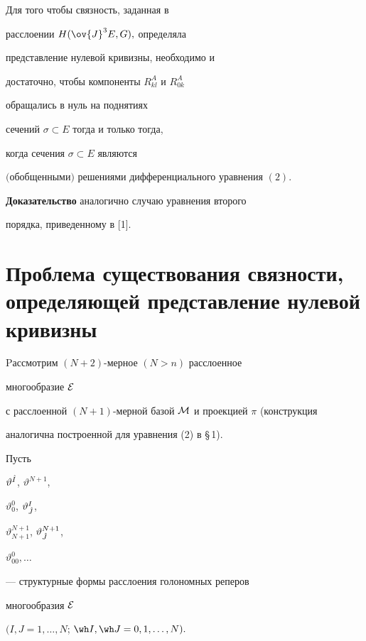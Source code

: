 \begin{lem}


Для того чтобы связность, заданная в


расслоении $H(\ov{J}^3E,G),$ определяла


представление нулевой кривизны, необходимо и


достаточно, чтобы компоненты $R^A_{kl}$ и $R^A_{0k}$


обращались в нуль на поднятиях


сечений $\sigma\subset E$ тогда и только тогда,


когда сечения $\sigma\subset E$ являются


$($обобщенными$)$ решениями дифференциального уравнения $(2)$.


\end{lem}





{\bf Доказательство} аналогично случаю уравнения второго


порядка, приведенному в [1].





\section{Проблема существования связности,\protect\\


определяющей представление нулевой кривизны}





Pассмотрим $(N+2)$-мерное $(N>n)$ расслоенное 


многообразие $\cal E$


с расслоенной $(N+1)$-мерной базой $\cal M$ и проекцией $\pi$ (конструкция


аналогична построенной для уравнения (2) в \S\,1).


Пусть


$\vartheta^{\Hat I}$, $\vartheta^{N+1}$,


$\vartheta^0_0$, $\vartheta^I_{\Hat{J}}$,


$\vartheta^{N+1}_{N+1}$, $\vartheta^{N+1}_{\Hat J}$,


$\vartheta^0_{00},\dotsc$


--- структурные формы расслоения голономных реперов 


многообразия $\cal E$


$(I,J=1,\dotsc ,N$; ${\wh I},{\wh J}=0,1,\dotsc ,N).$


